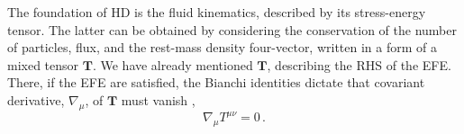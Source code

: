 %
%

The foundation of \ac{HD} is the fluid kinematics, described by its 
stress-energy tensor. The latter can be obtained by considering the 
conservation of the number of particles, flux, and the rest-mass density 
four-vector, written in a form of a mixed tensor $\boldsymbol{T}$.
We have already mentioned $\boldsymbol{T}$, describing the \ac{RHS} of the \ac{EFE}.
There, if the \ac{EFE} are satisfied, the Bianchi identities dictate that 
covariant derivative, $\nabla_{\mu}$, of $\boldsymbol{T}$ must vanish \ie, 
%
\begin{equation}
\nabla_{\mu}{T^{\mu\nu}} = 0\, .
\label{eq:theory:tmunu_eq_0}
\end{equation}
%

